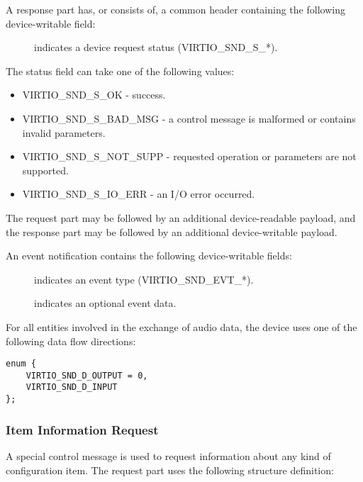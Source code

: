 A response part has, or consists of, a common header containing the following
device-writable field:

\begin{description}
\item[] indicates a device request status (VIRTIO_SND_S_*).
\end{description}

The status field can take one of the following values:

\begin{itemize}
\item VIRTIO_SND_S_OK - success.
\item VIRTIO_SND_S_BAD_MSG - a control message is malformed or contains invalid
parameters.
\item VIRTIO_SND_S_NOT_SUPP - requested operation or parameters are not supported.
\item VIRTIO_SND_S_IO_ERR - an I/O error occurred.
\end{itemize}

The request part may be followed by an additional device-readable payload,
and the response part may be followed by an additional device-writable payload.

An event notification contains the following device-writable fields:

\begin{description}
\item[] indicates an event type (VIRTIO_SND_EVT_*).
\item[] indicates an optional event data.
\end{description}

For all entities involved in the exchange of audio data, the device uses one of
the following data flow directions:

\begin{lstlisting}
enum {
    VIRTIO_SND_D_OUTPUT = 0,
    VIRTIO_SND_D_INPUT
};
\end{lstlisting}

\subsubsection{Item Information Request}\label{sec:Device Types / Sound Device / Device Operation / Item Information Request}

A special control message is used to request information about any kind of
configuration item. The request part uses the following structure definition:

